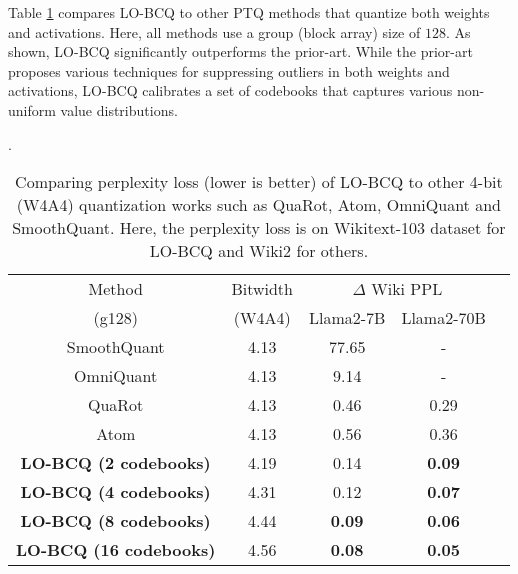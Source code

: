 Table \ref{tab:w4a4_comparison} compares LO-BCQ to other PTQ methods that quantize both weights and activations. Here, all methods use a group (block array) size of $128$. As shown, LO-BCQ significantly outperforms the prior-art. While the prior-art proposes various techniques for suppressing outliers in both weights and activations, LO-BCQ calibrates a set of codebooks that captures various non-uniform value distributions.

\begin{table} [!t]\scriptsize
\setlength{\tabcolsep}{4.75pt}
\caption{\small Comparing perplexity loss (lower is better) of LO-BCQ to other 4-bit (W4A4) quantization works such as QuaRot, Atom, OmniQuant and SmoothQuant. Here, the perplexity loss is on Wikitext-103 dataset for LO-BCQ and Wiki2 for others.}. \label{tab:w4a4_comparison}~
\centering
\begin{tabular}{|c|c|c||c|c|} 
 \hline
 Method & Bitwidth & \multicolumn{2}{c|}{$\Delta$ Wiki PPL } \\
 (g128) & (W4A4) & \cellcolor[gray]{0.9} Llama2-7B & \cellcolor[gray]{0.9} Llama2-70B \\
 \hline
 SmoothQuant & 4.13 & 77.65 & -  \\
 OmniQuant & 4.13 & 9.14 & - \\
 QuaRot & 4.13 & 0.46 &  0.29 \\
 Atom & 4.13 & 0.56 & 0.36 \\
  \rowcolor[gray]{0.9} 
  \textbf{LO-BCQ (2 codebooks)} & 4.19 & 0.14 &  \textbf{0.09} \\
   \rowcolor[gray]{0.9}
   \textbf{LO-BCQ (4 codebooks)} &  4.31 &  0.12 &  \textbf{0.07} \\
   \rowcolor[gray]{0.9} 
   \textbf{LO-BCQ (8 codebooks)} &  4.44 &  \textbf{0.09} & \textbf{0.06} \\
   \rowcolor[gray]{0.9}
  \textbf{LO-BCQ (16 codebooks)} & 4.56 & \textbf{0.08} &  \textbf{0.05} \\
 \hline
\end{tabular}
\end{table}

